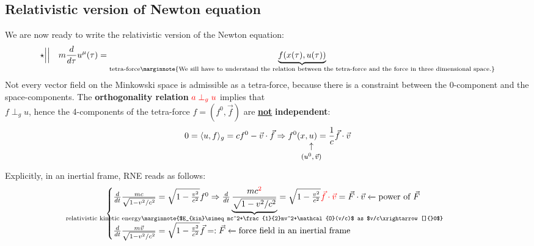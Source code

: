 \documentclass[../main.tex]{subfiles}
\begin{document}
\subsection{Relativistic version of Newton equation}
We are now ready to write the relativistic version of the Newton equation:
\[
\star \Big|\Big| \quad m\frac{d}{d\tau}u^{\mu}(\tau)=\underbrace{f(x(\tau),u(\tau))}_{\textrm{tetra-force\marginnote{We sill have to understand the relation between the tetra-force and the force in three dimensional space.}}}
\]
Not every vector field on the Minkowski space is admissible as a tetra-force, because there is a constraint between the 0-component and the space-components.
The \textbf{orthogonality relation} ${\color{red}a\perp_g u}$ implies that\\
$f\perp_g u$, hence the 4-components of the tetra-force $f=(f^0,\vec{f})$ are \underline{\textbf{not}} \textbf{independent}:
\[
0=\langle u,f \rangle_g=cf^0-\vec{v}\cdot\vec{f}\Rightarrow f^0(x,\underset{\mathclap{\tikz \node {$\uparrow$} node [below=1ex] {\footnotesize $(u^0,\vec{v})$};}}u)=\frac{1}{c}\vec{f}\cdot\vec{v}
\]
Explicitly, in an inertial frame, RNE reads as follows:
\[
\begin{cases}
\frac{d}{dt}\frac{mc}{\sqrt{1-v^2/c^2}}=\sqrt{1-\frac{v^2}{c^2}}f^0\Rightarrow \frac{d}{dt}\underbrace{\frac{mc^{\color{red}2}}{\sqrt{1-v^2/c^2}}}_{\mathclap{\text{relativistic kinetic energy\marginnote{$E_{kin}\simeq mc^2+\frac{1}{2}mv^2+\mathcal{O}(v/c)$ as $v/c\xrightarrow[]{}0$}}}}=\sqrt{1-\frac{v^2}{c^2}}{\color{red}\vec{f}\cdot\vec{v}}=\vec{F}\cdot\vec{v}\xleftarrow[]{}\text{power of $\vec{F}$} \\
\frac{d}{dt}\frac{m\vec{v}}{\sqrt{1-v^2/c^2}}=\sqrt{1-\frac{v^2}{c^2}}\vec{f}=:\vec{F}\xleftarrow[]{}\text{force field in an inertial frame}
\end{cases}
\]
\end{document}
